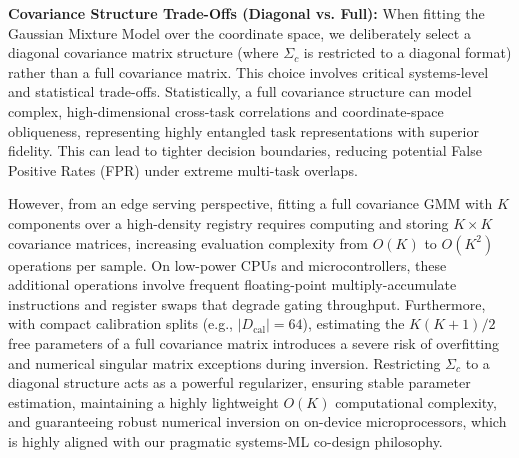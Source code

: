 \textbf{Covariance Structure Trade-Offs (Diagonal vs. Full):}
When fitting the Gaussian Mixture Model over the coordinate space, we deliberately select a diagonal covariance matrix structure (where $\Sigma_c$ is restricted to a diagonal format) rather than a full covariance matrix. This choice involves critical systems-level and statistical trade-offs. Statistically, a full covariance structure can model complex, high-dimensional cross-task correlations and coordinate-space obliqueness, representing highly entangled task representations with superior fidelity. This can lead to tighter decision boundaries, reducing potential False Positive Rates (FPR) under extreme multi-task overlaps. 

However, from an edge serving perspective, fitting a full covariance GMM with $K$ components over a high-density registry requires computing and storing $K \times K$ covariance matrices, increasing evaluation complexity from $O(K)$ to $O(K^2)$ operations per sample. On low-power CPUs and microcontrollers, these additional operations involve frequent floating-point multiply-accumulate instructions and register swaps that degrade gating throughput. Furthermore, with compact calibration splits (e.g., $|D_{\text{cal}}| = 64$), estimating the $K(K+1)/2$ free parameters of a full covariance matrix introduces a severe risk of overfitting and numerical singular matrix exceptions during inversion. Restricting $\Sigma_c$ to a diagonal structure acts as a powerful regularizer, ensuring stable parameter estimation, maintaining a highly lightweight $O(K)$ computational complexity, and guaranteeing robust numerical inversion on on-device microprocessors, which is highly aligned with our pragmatic systems-ML co-design philosophy.


